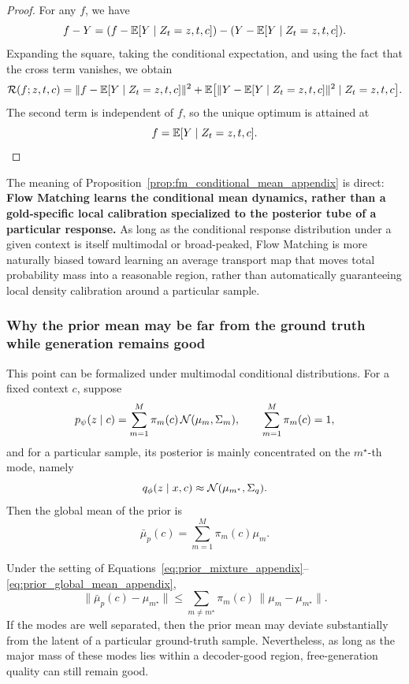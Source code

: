 \begin{proof}
For any $f$, we have
\[
f-Y=(f-\mathbb{E}[Y\mid Z_t=z,t,c])-(Y-\mathbb{E}[Y\mid Z_t=z,t,c]).
\]
Expanding the square, taking the conditional expectation, and using the fact that the cross term vanishes, we obtain
\[
\mathcal R(f;z,t,c)
=
\|f-\mathbb{E}[Y\mid Z_t=z,t,c]\|^2
+\mathbb{E}\bigl[\|Y-\mathbb{E}[Y\mid Z_t=z,t,c]\|^2\mid Z_t=z,t,c\bigr].
\]
The second term is independent of $f$, so the unique optimum is attained at
\[
f=\mathbb{E}[Y\mid Z_t=z,t,c].
\]
\end{proof}

The meaning of Proposition~\ref{prop:fm_conditional_mean_appendix} is direct: \textbf{Flow Matching learns the conditional mean dynamics, rather than a gold-specific local calibration specialized to the posterior tube of a particular response.} As long as the conditional response distribution under a given context is itself multimodal or broad-peaked, Flow Matching is more naturally biased toward learning an average transport map that moves total probability mass into a reasonable region, rather than automatically guaranteeing local density calibration around a particular sample.

\subsubsection{Why the prior mean may be far from the ground truth while generation remains good}

This point can be formalized under multimodal conditional distributions. For a fixed context $c$, suppose
\begin{equation}
p_{\psi}(z\mid c)
=
\sum_{m=1}^{M}\pi_m(c)\,\mathcal{N}(\mu_m,\Sigma_m),
\qquad
\sum_{m=1}^{M}\pi_m(c)=1,
\label{eq:prior_mixture_appendix}
\end{equation}
and for a particular sample, its posterior is mainly concentrated on the $m^{\star}$-th mode, namely
\begin{equation}
q_{\phi}(z\mid x,c)\approx \mathcal{N}(\mu_{m^{\star}},\Sigma_q).
\label{eq:posterior_single_mode_appendix}
\end{equation}
Then the global mean of the prior is
\begin{equation}
\bar\mu_p(c)=\sum_{m=1}^{M}\pi_m(c)\mu_m.
\label{eq:prior_global_mean_appendix}
\end{equation}

\begin{corollary}
\label{cor:multimodal_mean_gap_appendix}
Under the setting of Equations~\eqref{eq:prior_mixture_appendix}--\eqref{eq:prior_global_mean_appendix},
\begin{equation}
\|\bar\mu_p(c)-\mu_{m^{\star}}\|
\le
\sum_{m\neq m^{\star}}\pi_m(c)\,\|\mu_m-\mu_{m^{\star}}\|.
\label{eq:multimodal_mean_gap_bound_appendix}
\end{equation}
If the modes are well separated, then the prior mean may deviate substantially from the latent of a particular ground-truth sample. Nevertheless, as long as the major mass of these modes lies within a decoder-good region, free-generation quality can still remain good.
\end{corollary}

